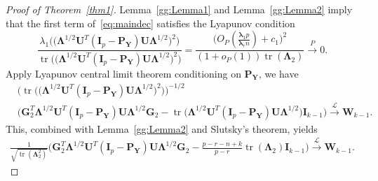\documentclass[12pt]{article} %
\DeclareMathOperator{\mytr}{tr}
\newcommand{\bP}{\mathbf{P}}
\newcommand{\bY}{\mathbf{Y}}
\newcommand{\bG}{\mathbf{G}}
\newcommand{\bI}{\mathbf{I}}
\newcommand{\bU}{\mathbf{U}}
\newcommand{\bW}{\mathbf{W}}
\newcommand{\bfsym}[1]{\ensuremath{\boldsymbol{#1}}}
\def\blambda {\bfsym {\lambda}}
\def\bLambda {\bfsym {\Lambda}}
\theoremstyle{definition}
\begin{document}
\begin{appendices}
\begin{proof}[\textrm{Proof of Theorem~\ref{thm1}}]
    Lemma~\eqref{gg:Lemma1} and Lemma~\eqref{gg:Lemma2} imply that the first term of~\eqref{eq:maindec} satisfies the Lyapunov condition
$$
    \frac{\lambda_1\Big(\big(\bLambda^{1/2} \bU^T (\bI_p-\bP_{\bY})\bU \bLambda^{1/2}\big)^2\Big)}{\mytr \Big( \big(\bLambda^{1/2} \bU^T (\bI_p-\bP_{\bY})\bU \bLambda^{1/2}\big)^2\Big)}
=
\frac{
\big( O_P(\frac{\blambda_1 p}{\blambda_r n})+c_1\big)^2
}{
    (1+o_P(1))\mytr(\bLambda_2)
}
\xrightarrow{P} 0.
$$
Apply Lyapunov central limit theorem conditioning on $\bP_{\bY}$, we have
$$
\begin{aligned}
    &\Big(\mytr \Big(\big(\bLambda^{1/2} \bU^T (\bI_p-\bP_{\bY})\bU \bLambda^{1/2}\big)^2\Big) \Big)^{-1/2}\\
    &\big( \bG_2^T \bLambda^{1/2}\bU^T (\bI_p-\bP_{\bY})\bU\bLambda^{1/2}\bG_2
    -\mytr\big(\bLambda^{1/2} \bU^T (\bI_p-\bP_{\bY})\bU \bLambda^{1/2}\big)
     \bI_{k-1} \big)
\xrightarrow{\mathcal{L}} \bW_{k-1}.
\end{aligned}
$$
    This, combined with Lemma~\ref{gg:Lemma2} and Slutsky's theorem, yields
$$
\begin{aligned}
    \frac{1}{\sqrt{\mytr(\bLambda_2^2)}}
    \big( \bG_2^T \bLambda^{1/2} \bU^T (\bI_p-\bP_{\bY})\bU\bLambda^{1/2}\bG_2
    -\tfrac{p-r-n+k}{p-r}\mytr(\bLambda_2)\bI_{k-1} \big)
\xrightarrow{\mathcal{L}} \bW_{k-1}.
\end{aligned}
$$


\end{proof}
\end{appendices}
\end{document}
